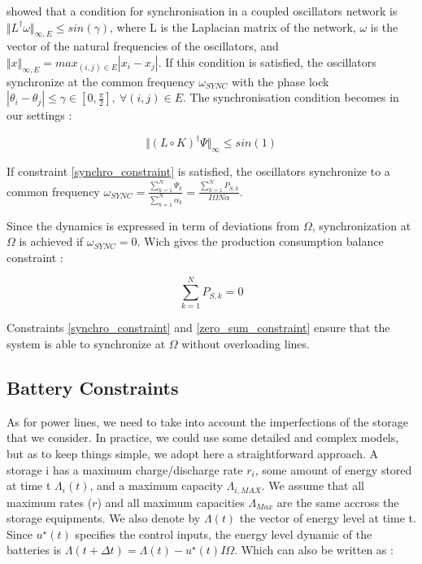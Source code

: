 \documentclass[conference]{IEEEtran}
\begin{document}

\cite{Dorfler2013} showed that a condition for synchronisation in a coupled oscillators network is $ \Vert L^{\dagger}\omega \Vert_{\infty,E} \leq sin(\gamma) $, where L is the Laplacian matrix of the network, $ \omega $ is the vector of the natural frequencies of the oscillators, and $ \Vert x \Vert_{\infty,E} = max_{(i,j) \in E} \left| x_i - x_j \right| $. If this condition is satisfied, the oscillators synchronize at the common frequency $ \omega_{SYNC} $ with the phase lock $ \left| \theta_i - \theta_j \right| \leq    \gamma \in[0,\frac{\pi}{2}],\ \forall (i,j) \in E $. The synchronisation condition becomes in our settings :

\begin{equation}
\label{synchro_constraint}
\Vert \left( L \circ K \right)^{\dagger} \Psi \Vert_{\infty} \leq sin(1)
\end{equation}

If constraint \ref{synchro_constraint} is satisfied, the oscillators synchronize to a common frequency $ \omega_{SYNC} = \frac{\sum_{k=1}^{N}\Psi_k}{\sum_{k=1}^{N}\alpha_k} = \frac{\sum_{k=1}^{N}P_{S,k}}{I\Omega N \alpha}$. 

Since the dynamics is expressed in term of deviations from $ \Omega$, synchronization at $ \Omega $ is achieved if $\omega_{SYNC} = 0 $. Wich gives the production consumption balance constraint :

\begin{equation}
\label{zero_sum_constraint}
\sum_{k=1}^{N} P_{S,k} = 0
\end{equation}

Constraints \ref{synchro_constraint} and \ref{zero_sum_constraint} ensure that the system is able to synchronize at $\Omega$ without overloading lines.


\subsection{Battery Constraints}

As for power lines, we need to take into account the imperfections of the storage that we consider. In practice, we could use some detailed and complex models, but as to keep things simple, we adopt here a straightforward approach. A storage i has a maximum charge/discharge rate $r_i$, some amount of energy stored at time t $ \Lambda_i(t) $, and a maximum capacity $ \Lambda_{i, MAX} $. We assume that all maximum rates ($r$) and all maximum capacities $\Lambda_{Max}$ are the same accross the storage equipments. We also denote by $ \Lambda(t) $ the vector of energy level at time t. Since $ u^{\star}(t) $ specifies the control inputs, the energy level dynamic of the batteries is $ \Lambda(t+\Delta t) = \Lambda(t) - u^{\star}(t) I \Omega $. Which can also be written as :
\end{document}
